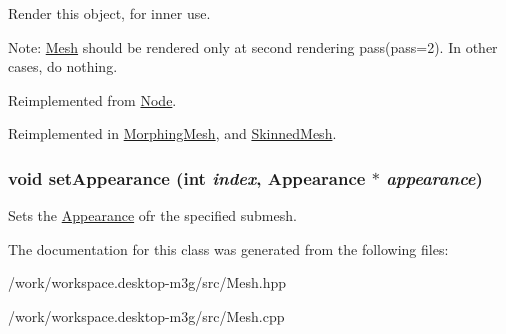 Render this object, for inner use.

Note: \hyperlink{classm3g_1_1Mesh}{Mesh} should be rendered only at second rendering pass(pass=2). In other cases, do nothing. 

Reimplemented from \hyperlink{classm3g_1_1Node_8babc8a79b78615da51161e94029eea9}{Node}.

Reimplemented in \hyperlink{classm3g_1_1MorphingMesh_8babc8a79b78615da51161e94029eea9}{MorphingMesh}, and \hyperlink{classm3g_1_1SkinnedMesh_8babc8a79b78615da51161e94029eea9}{SkinnedMesh}.\hypertarget{classm3g_1_1Mesh_bb03b872c453c4f8f3fe31e8b54d1b52}{
\subsubsection[{setAppearance}]{\setlength{\rightskip}{0pt plus 5cm}void setAppearance (int {\em index}, \/  {\bf Appearance} $\ast$ {\em appearance})}}
\label{classm3g_1_1Mesh_bb03b872c453c4f8f3fe31e8b54d1b52}


Sets the \hyperlink{classm3g_1_1Appearance}{Appearance} ofr the specified submesh. 

The documentation for this class was generated from the following files:\begin{CompactItemize}
\item 
/work/workspace.desktop-m3g/src/Mesh.hpp\item 
/work/workspace.desktop-m3g/src/Mesh.cpp\end{CompactItemize}
